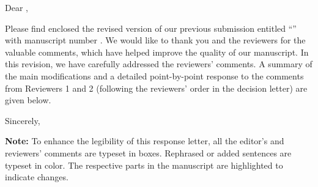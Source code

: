 \thispagestyle{empty}
\noindent Dear \editorname,

Please find enclosed the revised version of our previous submission entitled \enquote{\thetitle} with manuscript number \manuscript. We would like to thank you and the reviewers for the valuable comments, which have helped improve the quality of our manuscript.
In this revision, we have carefully addressed the reviewers' comments. A summary of the main modifications and a detailed point-by-point response to the comments from Reviewers 1 and 2 (following the reviewers' order in the decision letter) are given below.
\vspace{8em}

\noindent Sincerely,

\noindent\theauthor

\vfill
\textbf{Note:} To enhance the legibility of this response letter, all the editor's and reviewers' comments are typeset in boxes. Rephrased or added sentences are typeset in color. The respective parts in the manuscript are highlighted to indicate changes.
